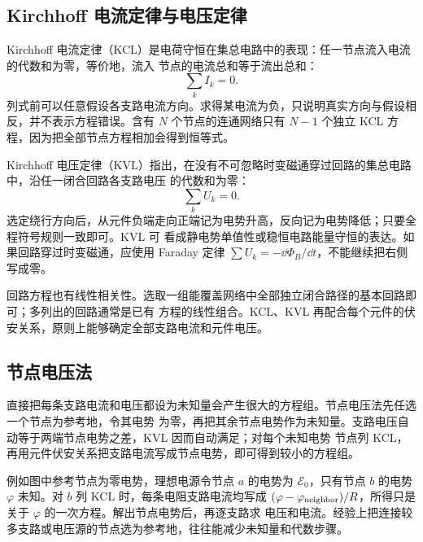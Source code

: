 \circuitTerminologyDiagram

\subsection*{Kirchhoff 电流定律与电压定律}

Kirchhoff 电流定律（KCL）是电荷守恒在集总电路中的表现：任一节点流入电流的代数和为零，等价地，流入
节点的电流总和等于流出总和：
\begin{equation}
  \boxed{\sum_k I_k=0}.
\end{equation}
列式前可以任意假设各支路电流方向。求得某电流为负，只说明真实方向与假设相反，并不表示方程错误。含有
$N$ 个节点的连通网络只有 $N-1$ 个独立 KCL 方程，因为把全部节点方程相加会得到恒等式。

Kirchhoff 电压定律（KVL）指出，在没有不可忽略时变磁通穿过回路的集总电路中，沿任一闭合回路各支路电压
的代数和为零：
\begin{equation}
  \boxed{\sum_k U_k=0}.
\end{equation}
选定绕行方向后，从元件负端走向正端记为电势升高，反向记为电势降低；只要全程符号规则一致即可。KVL 可
看成静电势单值性或稳恒电路能量守恒的表达。如果回路穿过时变磁通，应使用 Faraday 定律
$\sum U_k=-\dd\Phi_B/\dd t$，不能继续把右侧写成零。

\kirchhoffDiagram

回路方程也有线性相关性。选取一组能覆盖网络中全部独立闭合路径的基本回路即可；多列出的回路通常是已有
方程的线性组合。KCL、KVL 再配合每个元件的伏安关系，原则上能够确定全部支路电流和元件电压。

\subsection*{节点电压法}

直接把每条支路电流和电压都设为未知量会产生很大的方程组。节点电压法先任选一个节点为参考地，令其电势
为零，再把其余节点电势作为未知量。支路电压自动等于两端节点电势之差，KVL 因而自动满足；对每个未知电势
节点列 KCL，再用元件伏安关系把支路电流写成节点电势，即可得到较小的方程组。

\nodeMethodDiagram

例如图中参考节点为零电势，理想电源令节点 $a$ 的电势为 $\mathcal E_0$，只有节点 $b$ 的电势 $\varphi$
未知。对 $b$ 列 KCL 时，每条电阻支路电流均写成
$(\varphi-\varphi_{\rm neighbor})/R$，所得只是关于 $\varphi$ 的一次方程。解出节点电势后，再逐支路求
电压和电流。经验上把连接较多支路或电压源的节点选为参考地，往往能减少未知量和代数步骤。




